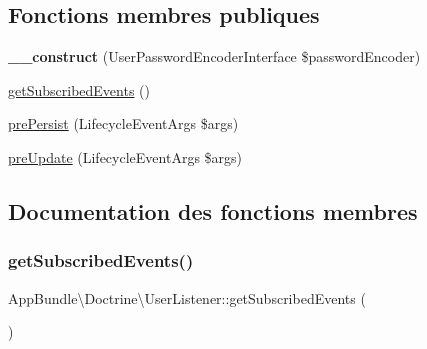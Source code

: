 \subsection*{Fonctions membres publiques}
\begin{DoxyCompactItemize}
\item 
\mbox{\label{classAppBundle_1_1Doctrine_1_1UserListener_a0823adc689c412f29cb0a604777240c9}} 
{\bfseries \+\_\+\+\_\+construct} (User\+Password\+Encoder\+Interface \$password\+Encoder)
\item 
\hyperlink{classAppBundle_1_1Doctrine_1_1UserListener_ae58d3c2bb73abe40f5ffd136f7c8de7b}{get\+Subscribed\+Events} ()
\item 
\hyperlink{classAppBundle_1_1Doctrine_1_1UserListener_a1273db7d6a783dbd78b01cd7c1b78de9}{pre\+Persist} (Lifecycle\+Event\+Args \$args)
\item 
\hyperlink{classAppBundle_1_1Doctrine_1_1UserListener_a05c3f700be2b3d36f27a26d46f2e9845}{pre\+Update} (Lifecycle\+Event\+Args \$args)
\end{DoxyCompactItemize}


\subsection{Documentation des fonctions membres}
\mbox{\label{classAppBundle_1_1Doctrine_1_1UserListener_ae58d3c2bb73abe40f5ffd136f7c8de7b}} 
\subsubsection{\texorpdfstring{get\+Subscribed\+Events()}{getSubscribedEvents()}}
{\footnotesize\ttfamily App\+Bundle\textbackslash{}\+Doctrine\textbackslash{}\+User\+Listener\+::get\+Subscribed\+Events (\begin{DoxyParamCaption}{ }\end{DoxyParamCaption})}

\mbox{\label{classAppBundle_1_1Doctrine_1_1UserListener_a1273db7d6a783dbd78b01cd7c1b78de9}} 
